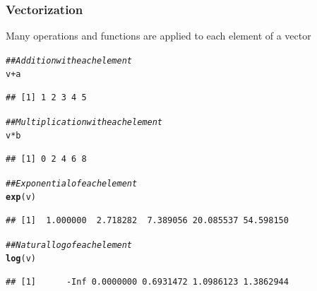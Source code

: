 \documentclass{beamer}\usepackage[]{graphicx}\usepackage[]{xcolor}
\makeatletter
\newcommand{\hlcom}[1]{\textcolor[rgb]{0.678,0.584,0.686}{\textit{#1}}}%
\newcommand{\hlopt}[1]{\textcolor[rgb]{0,0,0}{#1}}%
\newcommand{\hlstd}[1]{\textcolor[rgb]{0.345,0.345,0.345}{#1}}%
\newcommand{\hlkwd}[1]{\textcolor[rgb]{0.737,0.353,0.396}{\textbf{#1}}}%
\newenvironment{kframe}{%
 \def\at@end@of@kframe{}%
 \ifinner\ifhmode%
  \def\at@end@of@kframe{\end{minipage}}%
  \begin{minipage}{\columnwidth}%
 \fi\fi%
 \def\FrameCommand##1{\hskip\@totalleftmargin \hskip-\fboxsep
 \colorbox{shadecolor}{##1}\hskip-\fboxsep
     \hskip-\linewidth \hskip-\@totalleftmargin \hskip\columnwidth}%
 \MakeFramed {\advance\hsize-\width
   \@totalleftmargin\z@ \linewidth\hsize
   \@setminipage}}%
 {\par\unskip\endMakeFramed%
 \at@end@of@kframe}
\newenvironment{knitrout}{}{} %
\makeatother
\begin{document}
\begin{frame}[fragile]\frametitle{Vectorization}
    Many operations and functions are applied to each element of a vector
\begin{knitrout}\footnotesize
{}\color{fgcolor}\begin{kframe}
\begin{alltt}
\hlcom{## Addition with each element}
\hlstd{v} \hlopt{+} \hlstd{a}
\end{alltt}
\begin{verbatim}
## [1] 1 2 3 4 5
\end{verbatim}
\begin{alltt}
\hlcom{## Multiplication with each element}
\hlstd{v} \hlopt{*} \hlstd{b}
\end{alltt}
\begin{verbatim}
## [1] 0 2 4 6 8
\end{verbatim}
\begin{alltt}
\hlcom{## Exponential of each element}
\hlkwd{exp}\hlstd{(v)}
\end{alltt}
\begin{verbatim}
## [1]  1.000000  2.718282  7.389056 20.085537 54.598150
\end{verbatim}
\begin{alltt}
\hlcom{## Natural log of each element}
\hlkwd{log}\hlstd{(v)}
\end{alltt}
\begin{verbatim}
## [1]      -Inf 0.0000000 0.6931472 1.0986123 1.3862944
\end{verbatim}
\end{kframe}
\end{knitrout}
\end{frame}
\end{document}
